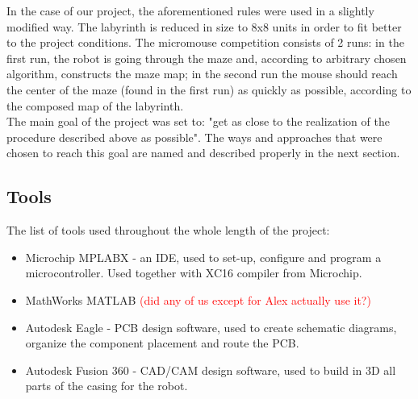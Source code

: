  In the case of our project, the aforementioned rules were used in a slightly modified way. The labyrinth is reduced in size to 8x8 units in order to fit better to the project conditions. The micromouse competition consists of 2 runs: in the first run, the robot is going through the maze and, according to arbitrary chosen algorithm, constructs the maze map; in the second run the mouse should reach the center of the maze (found in the first run) as quickly as possible, according to the composed map of the labyrinth. \\
 The main goal of the project was set to:  "get as close to the realization of the procedure described above as possible".
 The ways and approaches that were chosen to reach this goal are named and described properly in the next section.
 
 \subsection{Tools}
 
The list of tools used throughout the whole length of the project:
\begin{itemize}
    \item Microchip MPLABX - an IDE, used to set-up, configure and program a microcontroller. Used together with XC16 compiler from Microchip.
    \item MathWorks MATLAB \textcolor{red}{(did any of us except for Alex actually use it?)}
    \item Autodesk Eagle - PCB design software, used to create schematic diagrams, organize the component placement and route the PCB.
    \item Autodesk Fusion 360 -  CAD/CAM design software, used to build in 3D all parts of the casing for the robot.
\end{itemize}

